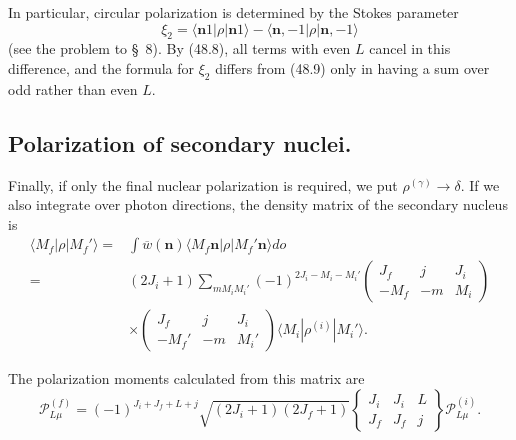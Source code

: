 In particular, circular polarization is determined by the Stokes parameter
\[
\xi_2=\langle\mathbf n1|\rho|\mathbf n1\rangle
-\langle\mathbf n,-1|\rho|\mathbf n,-1\rangle
\]
(see the problem to \S~8). By (48.8), all terms with even $L$ cancel in this difference, and the formula for $\xi_2$ differs from (48.9) only in having a sum over odd rather than even $L$.

\subsection*{Polarization of secondary nuclei.} Finally, if only the final nuclear polarization is required, we put $\rho^{(\gamma)}\to\delta$. If we also integrate over photon directions, the density matrix of the secondary nucleus is
\[
\begin{split}
\langle M_f|\rho|M_f'\rangle
={}&\int\overline w(\mathbf n)
\langle M_f\mathbf n|\rho|M_f'\mathbf n\rangle do\\
={}&(2J_i+1)\sum_{mM_iM_i'}(-1)^{2J_i-M_i-M_i'}
\begin{pmatrix}J_f&j&J_i\\-M_f&-m&M_i\end{pmatrix}\\
&\times\begin{pmatrix}J_f&j&J_i\\-M_f'&-m&M_i'\end{pmatrix}
\langle M_i|\rho^{(i)}|M_i'\rangle .
\end{split}
\]

The polarization moments calculated from this matrix are
\begin{equation}
\mathcal P_{L\mu}^{(f)}=(-1)^{J_i+J_f+L+j}
\sqrt{(2J_i+1)(2J_f+1)}
\left\{\begin{matrix}J_i&J_i&L\\J_f&J_f&j\end{matrix}\right\}
\mathcal P_{L\mu}^{(i)}.
\tag{48.17}
\end{equation}

